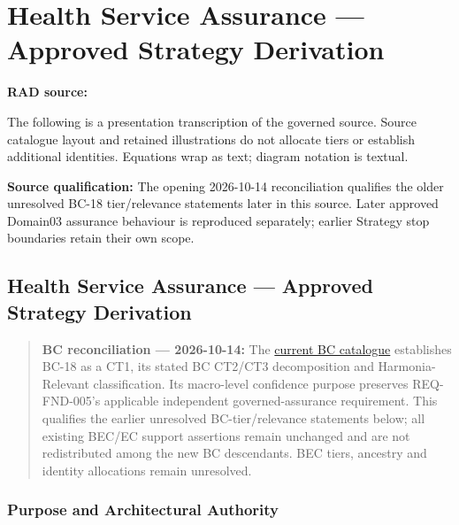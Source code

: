 \chapter{Health Service Assurance — Approved Strategy Derivation}\label{rad:assurance-strategy}
\noindent\textbf{RAD source:} \texttt{}

The following is a presentation transcription of the governed source. Source catalogue layout and retained illustrations do not allocate tiers or establish additional identities. Equations wrap as text; diagram notation is textual.

\textbf{Source qualification:} The opening 2026-10-14 reconciliation qualifies the older unresolved BC-18 tier/relevance statements later in this source. Later approved Domain03 assurance behaviour is reproduced separately; earlier Strategy stop boundaries retain their own scope.

\label{rad:assurance-strategy:1}
\section*{Health Service Assurance — Approved Strategy Derivation}
\label{rad:assurance-strategy:3}

\begin{quote}

\textbf{BC reconciliation — 2026-10-14:} The \hyperref[rad:business:1033]{current BC catalogue} establishes BC-18 as a CT1, its stated BC CT2/\allowbreak{}CT3 decomposition and Harmonia-Relevant classification. Its macro-level confidence purpose preserves REQ-FND-005's applicable independent governed-assurance requirement. This qualifies the earlier unresolved BC-tier/\allowbreak{}relevance statements below; all existing BEC/\allowbreak{}EC support assertions remain unchanged and are not redistributed among the new BC descendants. BEC tiers, ancestry and identity allocations remain unresolved.


\end{quote}
\label{rad:assurance-strategy:12}
\subsection*{Purpose and Architectural Authority}
\label{rad:assurance-strategy:14}

